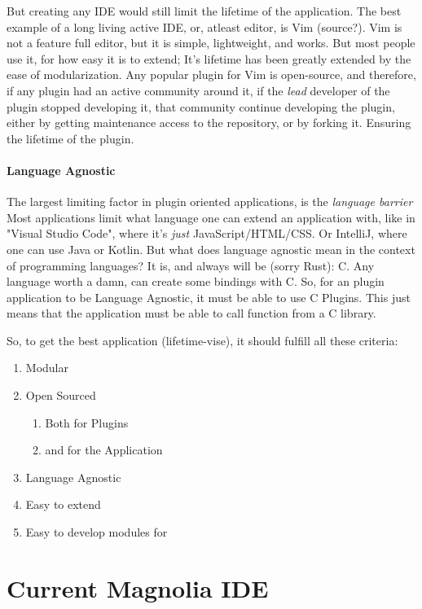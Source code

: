 But creating any IDE would still limit the lifetime of the application. The best
example of a long living active IDE, or, atleast editor, is Vim (source?). Vim
is not a feature full editor, but it is simple, lightweight, and works. But most
people use it, for how easy it is to extend; It's lifetime has been greatly
extended by the ease of modularization. Any popular plugin for Vim is
open-source, and therefore, if any plugin had an active community around it, if
the \textit{lead} developer of the plugin stopped developing it, that community
continue developing the plugin, either by getting maintenance access to the
repository, or by forking it. Ensuring the lifetime of the plugin.

\paragraph{Language Agnostic} The largest limiting factor in plugin oriented
applications, is the \textit{language barrier} Most applications limit what
language one can extend an application with, like in "Visual Studio Code", where
it's \textit{just} JavaScript/HTML/CSS. Or IntelliJ, where one can use Java or
Kotlin. But what does language agnostic mean in the context of programming
languages? It is, and always will be (sorry Rust): C. Any language worth a damn,
can create some bindings with C. So, for an plugin application to be Language
Agnostic, it must be able to use C Plugins. This just means that the application
must be able to call function from a C library.

So, to get the best application (lifetime-vise), it should fulfill all these criteria:

\begin{enumerate}
  \item Modular
  \item Open Sourced
    \begin{enumerate}
      \item Both for Plugins
      \item and for the Application
    \end{enumerate}
  \item Language Agnostic
  \item Easy to extend
  \item Easy to develop modules for
\end{enumerate}

\section{Current Magnolia IDE}
